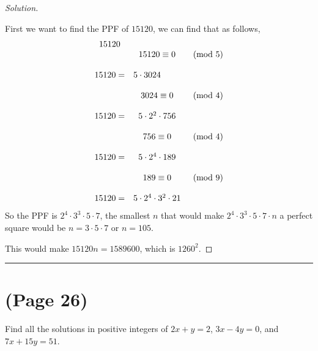\documentclass[11pt]{article}
\newcommand{\bline}{\noindent\rule[0.5ex]{\linewidth}{1pt}}
\newenvironment{problem}[2][Problem]{\begin{trivlist}
\item[\hskip \labelsep {\bfseries #1}\hskip \labelsep {\bfseries #2.}]}{\end{trivlist}}
\newenvironment{solution}
  {\renewcommand\qedsymbol{$~$}\begin{proof}[Solution]$ $\par\nobreak\ignorespaces}
  {\end{proof}}
\begin{document}
\begin{solution}
  First we want to find the PPF of $15120$, we can find that as follows,
  \[
    \begin{matrix}
      15120   &                                           &          \\
              & 15120                      \equiv 0       & \pmod{5} \\
      \\
      15120 = & \multicolumn{2}{l}{5 \cdot 3024}                     \\
      \\
              & 3024                             \equiv 0 & \pmod{4} \\
      \\
      15120 = & 5 \cdot 2^2 \cdot 756                     &          \\
      \\
              & 756                             \equiv 0  & \pmod{4} \\
      \\

      15120 = & 5 \cdot 2^4 \cdot 189                                \\
      \\
              & 189                             \equiv 0  & \pmod{9} \\
      \\
      15120 = & 5 \cdot 2^4 \cdot 3^2 \cdot 21                       \\
    \end{matrix}
  \]
  So the PPF is $2^4 \cdot 3^3 \cdot 5\cdot 7$, the smallest $n$ that would make $2^4 \cdot 3^3 \cdot 5\cdot 7\cdot n$ a perfect square would be $n=3\cdot 5 \cdot 7$ or $n=105$.

  This would make $15120n = 1589600$, which is $1260^2$.
\end{solution}


\bline
\section{(Page 26)}

\begin{problem}{4}
Find all the solutions in positive integers of $2x+y=2$, $3x-4y=0$, and $7x+15y=51$.
\end{problem}
\end{document}

